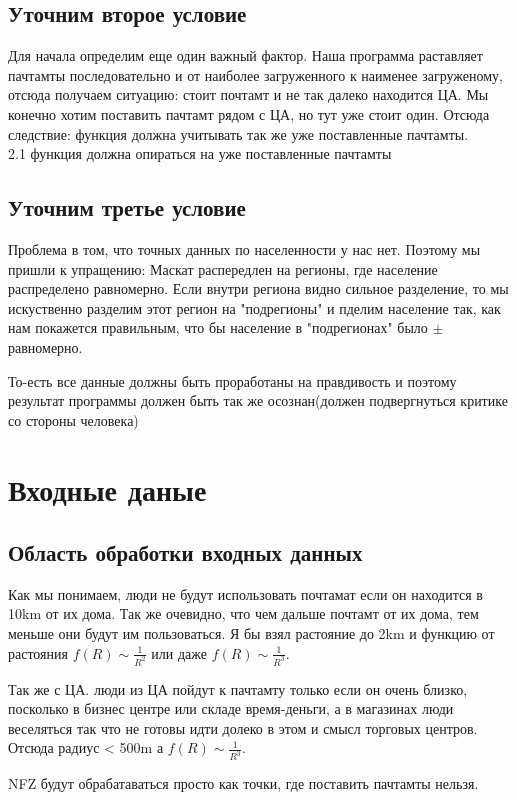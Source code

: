 \documentclass[12pt]{article} %
\begin{document}
 	\subsection{Уточним второе условие}
 	\hspace*{10mm} Для начала определим еще один важный фактор. Наша программа раставляет пачтамты последовательно и от наиболее загруженного к наименее загруженому, отсюда получаем ситуацию: стоит почтамт и не так далеко находится ЦА. Мы конечно хотим поставить пачтамт рядом с ЦА, но тут уже стоит один. Отсюда следствие: функция должна учитывать так же уже поставленные пачтамты. \\
 	\hspace*{5mm}2.1 функция должна опираться на уже поставленные пачтамты 
 	\subsection{Уточним третье условие}
 	\hspace*{1cm}Проблема в том, что точных данных по населенности у нас нет. Поэтому мы пришли к упращению: Маскат распередлен на регионы, где население распределено равномерно. Если внутри региона видно сильное разделение, то мы искуственно разделим этот регион на "подрегионы" и пделим население так, как нам покажется правильным, что бы население в "подрегионах" было $\pm$ равномерно.\par
 	То-есть все данные должны быть проработаны на правдивость и поэтому результат программы должен быть так же осознан(должен подвергнуться критике со стороны человека) 
 	\section{Входные даные}
 	\subsection{Область обработки входных данных}
 	\hspace*{1cm} Как мы понимаем, люди не будут использовать почтамат если он находится в 10km от их дома. Так же очевидно, что чем дальше почтамт от их дома, тем меньше они будут им пользоваться. Я бы взял растояние до 2km и функцию от растояния $f(R)\sim\frac{1}{R^2}$ или даже $f(R)\sim\frac{1}{R^3}$.\par
 	 Так же с ЦА. люди из ЦА пойдут к пачтамту только если он очень близко, посколько в бизнес центре или складе время-деньги, а в магазинах люди веселяться так что не готовы идти долеко в этом и смысл торговых центров. Отсюда радиус < 500m а $f(R)\sim \frac{1}{R^3}$. \par 
 	 NFZ будут обрабатаваться просто как точки, где поставить пачтамты нельзя. 
\end{document}
